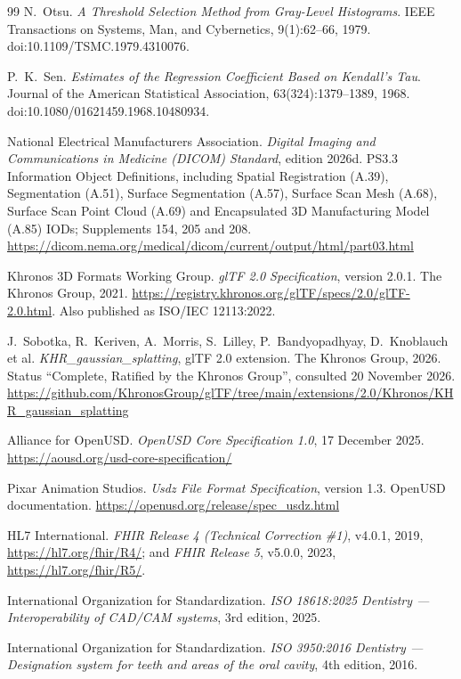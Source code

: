 \documentclass[11pt,a4paper]{article}
\begin{document}
\begin{thebibliography}{99}
N.~Otsu.
\emph{A Threshold Selection Method from Gray-Level Histograms}.
IEEE Transactions on Systems, Man, and Cybernetics, 9(1):62--66, 1979.
doi:10.1109/TSMC.1979.4310076.

P.~K.~Sen.
\emph{Estimates of the Regression Coefficient Based on Kendall's Tau}.
Journal of the American Statistical Association, 63(324):1379--1389, 1968.
doi:10.1080/01621459.1968.10480934.

National Electrical Manufacturers Association.
\emph{Digital Imaging and Communications in Medicine (DICOM) Standard}, edition 2026d.
PS3.3 Information Object Definitions, including Spatial Registration (A.39), Segmentation
(A.51), Surface Segmentation (A.57), Surface Scan Mesh (A.68), Surface Scan Point Cloud
(A.69) and Encapsulated 3D Manufacturing Model (A.85) IODs; Supplements 154, 205 and 208.
\url{https://dicom.nema.org/medical/dicom/current/output/html/part03.html}

Khronos 3D Formats Working Group.
\emph{glTF 2.0 Specification}, version 2.0.1. The Khronos Group, 2021.
\url{https://registry.khronos.org/glTF/specs/2.0/glTF-2.0.html}.
Also published as ISO/IEC 12113:2022.

J.~Sobotka, R.~Keriven, A.~Morris, S.~Lilley, P.~Bandyopadhyay, D.~Knoblauch et al.
\emph{KHR\_gaussian\_splatting}, glTF 2.0 extension. The Khronos Group, 2026. Status
``Complete, Ratified by the Khronos Group'', consulted 20 November 2026.
\url{https://github.com/KhronosGroup/glTF/tree/main/extensions/2.0/Khronos/KHR_gaussian_splatting}

Alliance for OpenUSD.
\emph{OpenUSD Core Specification 1.0}, 17 December 2025.
\url{https://aousd.org/usd-core-specification/}

Pixar Animation Studios.
\emph{Usdz File Format Specification}, version 1.3. OpenUSD documentation.
\url{https://openusd.org/release/spec_usdz.html}

HL7 International.
\emph{FHIR Release 4 (Technical Correction \#1)}, v4.0.1, 2019,
\url{https://hl7.org/fhir/R4/}; and \emph{FHIR Release 5}, v5.0.0, 2023,
\url{https://hl7.org/fhir/R5/}.

International Organization for Standardization.
\emph{ISO 18618:2025 Dentistry --- Interoperability of CAD/CAM systems}, 3rd edition, 2025.

International Organization for Standardization.
\emph{ISO 3950:2016 Dentistry --- Designation system for teeth and areas of the oral
cavity}, 4th edition, 2016.


\end{thebibliography}
\end{document}
